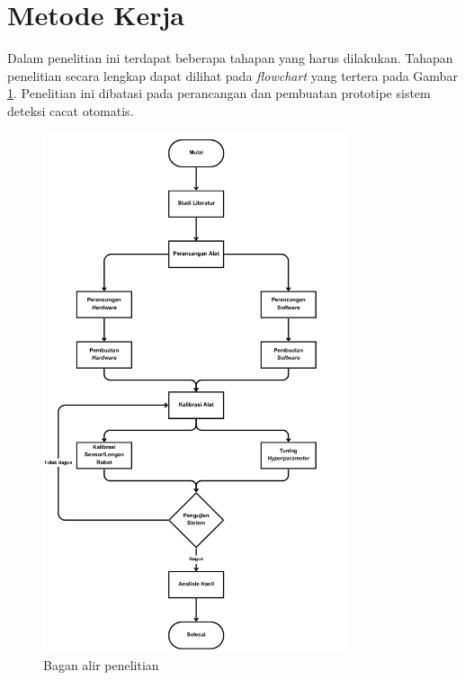 \vspace{1em}

\section{Metode Kerja}
Dalam penelitian ini terdapat beberapa tahapan yang harus dilakukan.
Tahapan penelitian secara lengkap dapat dilihat pada
\textit{flowchart} yang tertera pada
Gambar \ref{fig:bagan-umum}. Penelitian ini dibatasi pada perancangan
dan pembuatan prototipe sistem deteksi cacat otomatis.
\begin{figure}[H]
  \centering
  \includegraphics[width=0.8\textwidth]{gambar/bagan-umum.png}
  \caption{Bagan alir penelitian}
  \label{fig:bagan-umum}
\end{figure}
\vspace{-1em}


